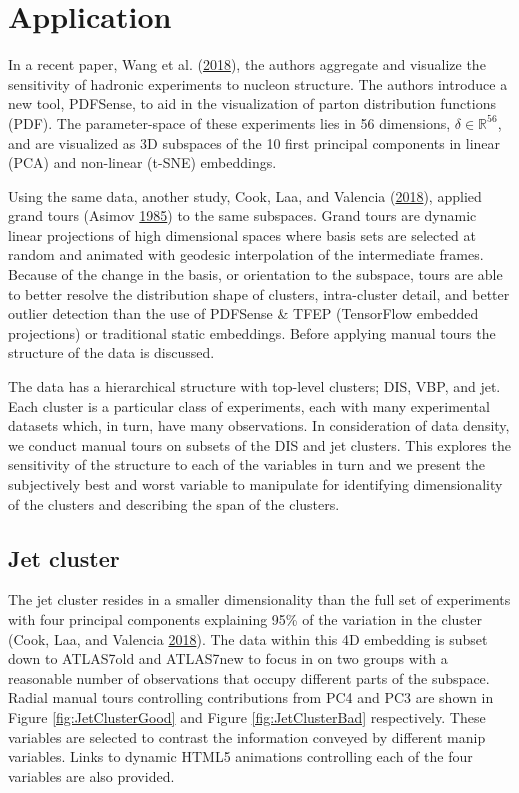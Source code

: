 \hypertarget{sec:application}{%
\section{Application}\label{sec:application}}

In a recent paper, Wang et al.
(\protect\hyperlink{ref-wang_mapping_2018}{2018}), the authors aggregate
and visualize the sensitivity of hadronic experiments to nucleon
structure. The authors introduce a new tool, PDFSense, to aid in the
visualization of parton distribution functions (PDF). The
parameter-space of these experiments lies in 56 dimensions,
\(\delta \in \mathbb{R}^{56}\), and are visualized as 3D subspaces of
the 10 first principal components in linear (PCA) and non-linear (t-SNE)
embeddings.

Using the same data, another study, Cook, Laa, and Valencia
(\protect\hyperlink{ref-cook_dynamical_2018}{2018}), applied grand tours
(Asimov \protect\hyperlink{ref-asimov_grand_1985}{1985}) to the same
subspaces. Grand tours are dynamic linear projections of high
dimensional spaces where basis sets are selected at random and animated
with geodesic interpolation of the intermediate frames. Because of the
change in the basis, or orientation to the subspace, tours are able to
better resolve the distribution shape of clusters, intra-cluster detail,
and better outlier detection than the use of PDFSense \& TFEP
(TensorFlow embedded projections) or traditional static embeddings.
Before applying manual tours the structure of the data is discussed.

The data has a hierarchical structure with top-level clusters; DIS, VBP,
and jet. Each cluster is a particular class of experiments, each with
many experimental datasets which, in turn, have many observations. In
consideration of data density, we conduct manual tours on subsets of the
DIS and jet clusters. This explores the sensitivity of the structure to
each of the variables in turn and we present the subjectively best and
worst variable to manipulate for identifying dimensionality of the
clusters and describing the span of the clusters.

\hypertarget{jet-cluster}{%
\subsection{Jet cluster}\label{jet-cluster}}

The jet cluster resides in a smaller dimensionality than the full set of
experiments with four principal components explaining 95\% of the
variation in the cluster (Cook, Laa, and Valencia
\protect\hyperlink{ref-cook_dynamical_2018}{2018}). The data within this
4D embedding is subset down to ATLAS7old and ATLAS7new to focus in on
two groups with a reasonable number of observations that occupy
different parts of the subspace. Radial manual tours controlling
contributions from PC4 and PC3 are shown in Figure
\ref{fig:JetClusterGood} and Figure \ref{fig:JetClusterBad}
respectively. These variables are selected to contrast the information
conveyed by different manip variables. Links to dynamic HTML5 animations
controlling each of the four variables are also provided.

